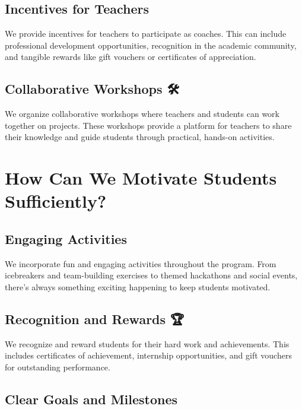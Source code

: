 \documentclass[
  letterpaper,
  DIV=11,
  numbers=noendperiod]{scrreprt}
\begin{document}
\subsection{Incentives for Teachers 🎁}\label{incentives-for-teachers}

We provide incentives for teachers to participate as coaches. This can
include professional development opportunities, recognition in the
academic community, and tangible rewards like gift vouchers or
certificates of appreciation.

\subsection{Collaborative Workshops 🛠️}\label{collaborative-workshops}

We organize collaborative workshops where teachers and students can work
together on projects. These workshops provide a platform for teachers to
share their knowledge and guide students through practical, hands-on
activities.

\section{How Can We Motivate Students Sufficiently?
🌟}\label{how-can-we-motivate-students-sufficiently}

\subsection{Engaging Activities 🎉}\label{engaging-activities}

We incorporate fun and engaging activities throughout the program. From
icebreakers and team-building exercises to themed hackathons and social
events, there's always something exciting happening to keep students
motivated.

\subsection{Recognition and Rewards 🏆}\label{recognition-and-rewards}

We recognize and reward students for their hard work and achievements.
This includes certificates of achievement, internship opportunities, and
gift vouchers for outstanding performance.

\subsection{Clear Goals and Milestones
🎯}\label{clear-goals-and-milestones}
\end{document}
